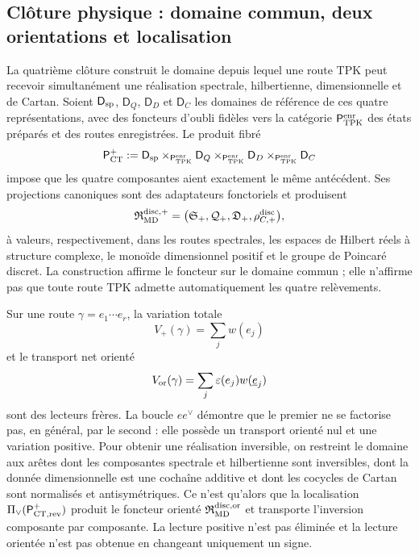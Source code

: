 \subsection*{Clôture physique : domaine commun, deux orientations et localisation}

La quatrième clôture construit le domaine depuis lequel une route TPK peut recevoir
simultanément une réalisation spectrale, hilbertienne, dimensionnelle et de Cartan.
Soient \(\mathsf D_{\rm sp}\), \(\mathsf D_Q\), \(\mathsf D_D\) et
\(\mathsf D_C\) les domaines de référence de ces quatre représentations, avec des
foncteurs d'oubli fidèles vers la catégorie
\(\mathsf P_{\rm TPK}^{\rm enr}\) des états préparés et des routes enregistrées.
Le produit fibré
\[
 \mathsf P_{\rm CT}^{+}
 :=\mathsf D_{\rm sp}
 \times_{\mathsf P_{\rm TPK}^{\rm enr}}\mathsf D_Q
 \times_{\mathsf P_{\rm TPK}^{\rm enr}}\mathsf D_D
 \times_{\mathsf P_{\rm TPK}^{\rm enr}}\mathsf D_C
\]
impose que les quatre composantes aient exactement le même antécédent.
Ses projections canoniques sont des adaptateurs fonctoriels et produisent
\[
 \mathfrak R_{\rm MD}^{\rm disc,+}
 =\bigl(\mathfrak S_+,\mathcal Q_+,\mathfrak D_+,
        \rho_{C,+}^{\rm disc}\bigr),
\]
à valeurs, respectivement, dans les routes spectrales, les espaces de Hilbert réels
à structure complexe, le monoïde dimensionnel positif et le groupe de
Poincaré discret. La construction affirme le foncteur sur le domaine commun ; elle
n'affirme pas que toute route TPK admette automatiquement les quatre relèvements.

Sur une route \(\gamma=e_1\cdots e_r\), la variation totale
\[
 V_+(\gamma)=\sum_jw(e_j)
\]
et le transport net orienté
\[
 V_{\rm or}(\gamma)=\sum_j\varepsilon(e_j)w(\underline e_j)
\]
sont des lecteurs frères. La boucle \(ee^\vee\) démontre que le premier ne se
factorise pas, en général, par le second : elle possède un transport orienté nul et une
variation positive. Pour obtenir une réalisation inversible, on restreint le
domaine aux arêtes dont les composantes spectrale et hilbertienne sont
inversibles, dont la donnée dimensionnelle est une cochaîne additive et dont les cocycles de
Cartan sont normalisés et antisymétriques. Ce n'est qu'alors que la localisation
\(\Pi_\vee(\mathsf P_{{\rm CT},{\rm rev}}^+)\) produit le foncteur orienté
\(\mathfrak R_{\rm MD}^{\rm disc,or}\) et transporte l'inversion composante par
composante. La lecture positive n'est pas éliminée et la lecture orientée n'est pas obtenue
en changeant uniquement un signe.

